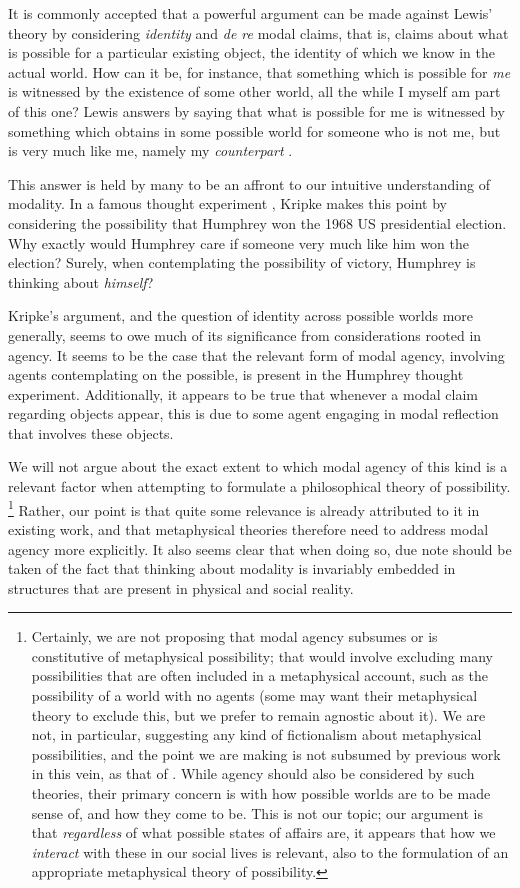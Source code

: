\documentclass{article}
\begin{document}
It is commonly accepted that a powerful argument can be made against Lewis' theory by considering \emph{identity} and \emph{de re} modal claims, that is, claims about what is possible for a particular existing object, the identity of which we know in the actual world. How can it be, for instance, that something which is possible for \emph{me} is witnessed by the existence of some other world, all the while I myself am part of this one? Lewis answers by saying that what is possible for me is witnessed by something which obtains in some possible world for someone who is not me, but is very much like me, namely my \emph{counterpart} \cite{LewisCPB}. 

This answer is held by many to be an affront to our intuitive understanding of modality. In a famous thought experiment \cite{KripkeNN}, Kripke makes this point by considering the possibility that Humphrey won the 1968 US presidential election. Why exactly would Humphrey care if someone very much like him won the election? Surely, when contemplating the possibility of victory, Humphrey is thinking about \emph{himself}?

Kripke's argument, and the question of identity across possible worlds more generally, seems to owe much of its significance from considerations rooted in agency. It seems to be the case that the relevant form of modal agency, involving agents contemplating on the possible, is present in the Humphrey thought experiment. Additionally, it appears to be true that whenever a modal claim regarding objects appear, this is due to some agent engaging in modal reflection that involves these objects.

We will not argue about the exact extent to which modal agency of this kind is a relevant factor when attempting to formulate a philosophical theory of possibility. \footnote{Certainly, we are not proposing that modal agency subsumes or is constitutive of metaphysical possibility; that would involve excluding many possibilities that are often included in a metaphysical account, such as the possibility of a world with no agents (some may want their metaphysical theory to exclude this, but we prefer to remain agnostic about it). We are not, in particular, suggesting any kind of fictionalism about metaphysical possibilities, and the point we are making is not subsumed by previous work in this vein, as that of \cite{ficr,ficrfix}. While agency should also be considered by such theories, their primary concern is with how possible worlds are to be made sense of, and how they come to be. This is not our topic; our argument is that \emph{regardless} of what possible states of affairs are, it appears that how we \emph{interact} 
with these in our social lives is relevant, also to the formulation of an appropriate metaphysical theory of possibility.} Rather, our point is that quite some relevance is already attributed to it in existing work, and that metaphysical theories therefore need to address modal agency more explicitly. It also seems clear that when doing so, due note should be taken of the fact that thinking about modality is invariably embedded in structures that are present in physical and social reality.
\end{document}
